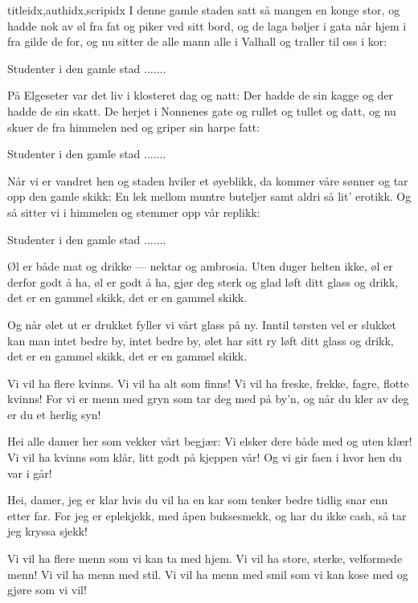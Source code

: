\documentclass[14pt,letterpaper,norsk]{article}
\begin{document}
\begin{songs}{titleidx,authidx,scripidx}
\beginverse
I denne gamle staden satt så mangen en konge stor,
og hadde nok av øl fra fat og piker ved sitt bord,
og de laga bøljer i gata når hjem i fra gilde de for,
og nu sitter de alle mann alle i Valhall og traller til oss i kor:
\endverse

\beginchorus
Studenter i den gamle stad .......
\endchorus

\beginverse
På Elgeseter var det liv i klosteret dag og natt:
Der hadde de sin kagge og der hadde de sin skatt.
De herjet i Nonnenes gate og rullet og tullet og datt,
og nu skuer de fra himmelen ned og griper sin harpe fatt:
\endverse

\beginchorus
Studenter i den gamle stad .......
\endchorus

\beginverse
Når vi er vandret hen og staden hviler et øyeblikk,
da kommer våre sønner og tar opp den gamle skikk:
En lek mellom muntre buteljer samt aldri så lit' erotikk.
Og så sitter vi i himmelen og stemmer opp vår replikk:
\endverse

\beginchorus
Studenter i den gamle stad .......
\endchorus
\endsong

\beginverse
Øl er både mat og drikke --- nektar og ambrosia.
Uten duger helten ikke, øl er derfor godt å ha,
øl er godt å ha, gjør deg sterk og glad
løft ditt glass og drikk, det er en gammel skikk,
det er en gammel skikk.
\endverse

\beginverse
Og når ølet ut er drukket fyller vi vårt glass på ny.
Inntil tørsten vel er slukket kan man intet bedre by,
intet bedre by, ølet har sitt ry
løft ditt glass og drikk, det er en gammel skikk, 
det er en gammel skikk.
\endverse
\endsong

\beginverse
Vi vil ha flere kvinns. 
Vi vil ha alt som finns! 
Vi vil ha freske, frekke, fagre, flotte kvinns! 
For vi er menn med gryn 
som tar deg med på by'n, 
og når du kler av deg 
er du et herlig syn! 
\endverse

\beginverse
Hei alle damer her 
som vekker vårt begjær: 
Vi elsker dere både med og uten klær! 
Vi vil ha kvinns som klår, 
litt godt på kjeppen vår! 
Og vi gir faen i hvor hen du var i går! 
\endverse

\beginverse
Hei, damer, jeg er klar 
hvis du vil ha en kar 
som tenker bedre tidlig snar enn etter far. 
For jeg er eplekjekk, 
med åpen buksesmekk, 
og har du ikke cash, 
så tar jeg kryssa sjekk! 
\endverse
\endsong

\beginverse
Vi vil ha flere menn
som vi kan ta med hjem.
Vi vil ha store, sterke, velformede menn!
Vi vil ha menn med stil.
Vi vil ha menn med smil
som vi kan kose med og gjøre som vi vil!
\endverse


\end{songs}
\end{document}
